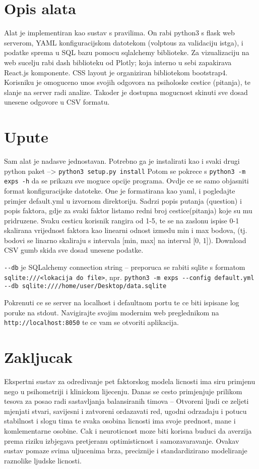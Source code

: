 \documentclass[times, utf8, seminar]{fer}
\begin{document}
\chapter{Opis alata}
Alat je implementiran kao sustav s pravilima. On rabi python3 s flask web serverom, YAML konfiguracijskom datotekom (volptous za validaciju istga), i podatke sprema u SQL bazu pomocu sqlalchemy biblioteke. Za vizualizaciju na web sucelju rabi dash biblioteku od Plotly; koja interno u sebi zapakirava React.js komponente. CSS layout je organiziran bibliotekom bootstrap4. Korisniku je omoguceno unos svojih odgovora na psiholoske cestice (pitanja), te slanje na server radi analize. Takoder je dostupna mogucnost skinuti sve dosad unesene odgovore u CSV formatu.

\chapter{Upute}

Sam alat je nadasve jednostavan.
Potrebno ga je instalirati kao i svaki drugi python paket --> \verb|python3 setup.py install|  Potom se pokrece s \verb|python3 -m exps -h| da se prikazu sve moguce opcije programa.
Ovdje ce se samo objasniti format konfiguracijske datoteke.
One je formatirana kao yaml, i pogledajte primjer default.yml u izvornom direktoriju.
Sadrzi popis putanja (question) i popis faktora, gdje za svaki faktor listamo redni broj cestice(pitanja) koje su mu pridruzene.
Svaku cesticu korisnik rangira od 1-5, te se na zaslonu ispise 0-1 skalirana vrijednost faktora kao linearni odnost izmedu min i max bodova, (tj. bodovi se linarno skaliraju s intervala [min, max] na interval [0, 1]).
Download CSV gumb skida sve dosad unesene podatke.

\verb|--db| je SQLalchemy connection string -- preporuca se rabiti sqlite s formatom \verb|sqlite:///<lokacija do file>|, npr. \verb|python3 -m exps --config default.yml --db sqlite:////home/user/Desktop/data.sqlite|

Pokrenuti ce se server na localhost i defaultnom portu te ce biti ispisane log poruke na stdout. Navigirajte svojim modernim web preglednikom na \verb|http://localhost:8050| te ce vam se otvoriti aplikacija.

\chapter{Zakljucak}

Ekspertni sustav za odredivanje pet faktorskog modela licnosti ima siru primjenu nego u psihometriji i klinickom lijecenju. Danas se cesto primjenjuje prilikom tesova za posao radi sastavljanja balansiranih timova -- Otvoreni ljudi ce zeljeti mjenjati stvari, savijesni i zatvoreni ordazavati red, ugodni odrzadaju i potucu stabilnost i slogu tima te svaka osobina licnosti ima svoje prednost, mane i komlementarne osobine. Cak i neuroticnost moze biti korisna buduci da averzija prema riziku izbjegava pretjeranu optimisticnost i samozavaravanje.
Ovakav sustav pomaze svima uljucenima brza, preciznije i standardizirano modeliranje raznolike ljudske licnosti.




\end{document}
